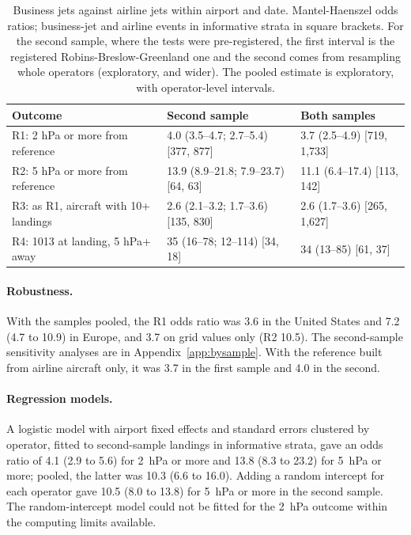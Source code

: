 \documentclass[11pt]{article}
\begin{document}
\begin{table}[!ht]
\centering
\caption{Business jets against airline jets within airport and date. Mantel-Haenszel odds ratios; business-jet and airline events in informative strata in square brackets. For the second sample, where the tests were pre-registered, the first interval is the registered Robins-Breslow-Greenland one and the second comes from resampling whole operators (exploratory, and wider). The pooled estimate is exploratory, with operator-level intervals.}\label{tab:or}
\footnotesize\setlength{\tabcolsep}{4pt}
\begin{tabular}{lll}
\toprule
Outcome & Second sample & Both samples \\
\midrule
R1: 2 hPa or more from reference & 4.0 (3.5--4.7; 2.7--5.4) [377, 877] & 3.7 (2.5--4.9) [719, 1{,}733] \\
R2: 5 hPa or more from reference & 13.9 (8.9--21.8; 7.9--23.7) [64, 63] & 11.1 (6.4--17.4) [113, 142] \\
R3: as R1, aircraft with 10+ landings & 2.6 (2.1--3.2; 1.7--3.6) [135, 830] & 2.6 (1.7--3.6) [265, 1{,}627] \\
R4: 1013 at landing, 5 hPa+ away & 35 (16--78; 12--114) [34, 18] & 34 (13--85) [61, 37] \\
\bottomrule
\end{tabular}
\end{table}

\paragraph{Robustness.} With the samples pooled, the R1 odds ratio was 3.6 in the United States and 7.2 (4.7 to 10.9) in Europe, and 3.7 on grid values only (R2 10.5). The second-sample sensitivity analyses are in Appendix~\ref{app:bysample}. With the reference built from airline aircraft only, it was 3.7 in the first sample and 4.0 in the second.

\paragraph{Regression models.} A logistic model with airport fixed effects and standard errors clustered by operator, fitted to second-sample landings in informative strata, gave an odds ratio of 4.1 (2.9 to 5.6) for 2~hPa or more and 13.8 (8.3 to 23.2) for 5~hPa or more; pooled, the latter was 10.3 (6.6 to 16.0). Adding a random intercept for each operator gave 10.5 (8.0 to 13.8) for 5~hPa or more in the second sample. The random-intercept model could not be fitted for the 2~hPa outcome within the computing limits available.
\end{document}
